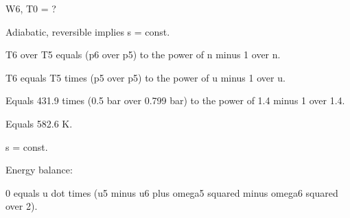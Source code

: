 W6, T0 = ?

Adiabatic, reversible implies s = const.

T6 over T5 equals (p6 over p5) to the power of n minus 1 over n.

T6 equals T5 times (p5 over p5) to the power of u minus 1 over u.

Equals 431.9 times (0.5 bar over 0.799 bar) to the power of 1.4 minus 1 over 1.4.

Equals 582.6 K.

s = const.

Energy balance:

0 equals u dot times (u5 minus u6 plus omega5 squared minus omega6 squared over 2).